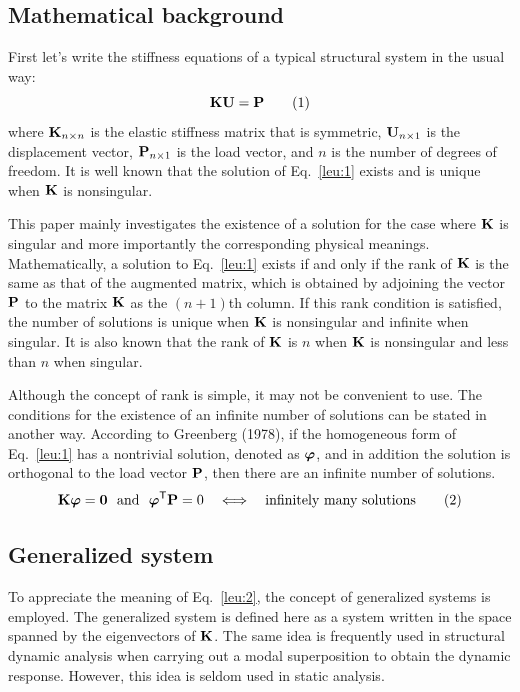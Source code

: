 \subsection*{Mathematical background}
First let's write the stiffness equations of a typical structural system in the usual way:
\begin{equation}
  \mathbf{K}\mathbf{U} = \mathbf{P} \tag{1}\label{leu:1}
\end{equation}
where $\mathbf{K}_{n\times n}$ is the elastic stiffness matrix that is symmetric, $\mathbf{U}_{n\times 1}$ is the displacement vector, $\mathbf{P}_{n\times 1}$ is the load vector, and $n$ is the number of degrees of freedom. It is well known that the solution of Eq.~\eqref{leu:1} exists and is unique when $\mathbf{K}$ is nonsingular.

This paper mainly investigates the existence of a solution for the case where $\mathbf{K}$ is singular and more importantly the corresponding physical meanings. Mathematically, a solution to Eq.~\eqref{leu:1} exists if and only if the rank of $\mathbf{K}$ is the same as that of the augmented matrix, which is obtained by adjoining the vector $\mathbf{P}$ to the matrix $\mathbf{K}$ as the $(n+1)$th column. If this rank condition is satisfied, the number of solutions is unique when $\mathbf{K}$ is nonsingular and infinite when singular. It is also known that the rank of $\mathbf{K}$ is $n$ when $\mathbf{K}$ is nonsingular and less than $n$ when singular.

Although the concept of rank is simple, it may not be convenient to use. The conditions for the existence of an infinite number of solutions can be stated in another way. According to Greenberg (1978), if the homogeneous form of Eq.~\eqref{leu:1} has a nontrivial solution, denoted as $\bm{\varphi}$, and in addition the solution is orthogonal to the load vector $\mathbf{P}$, then there are an infinite number of solutions.
\begin{equation}
  \Kmat\bs{\varphi} = \mat{0}\ \text{ and }\ \bs{\varphi}^\tr\Pvec = 0 \quad\Longleftrightarrow\quad \text{infinitely many solutions} \tag{2}\label{leu:2}
\end{equation}

\subsection*{Generalized system}
To appreciate the meaning of Eq.~\eqref{leu:2}, the concept of generalized systems is employed. The generalized system is defined here as a system written in the space spanned by the eigenvectors of $\mathbf{K}$. The same idea is frequently used in structural dynamic analysis when carrying out a modal superposition to obtain the dynamic response. However, this idea is seldom used in static analysis.

